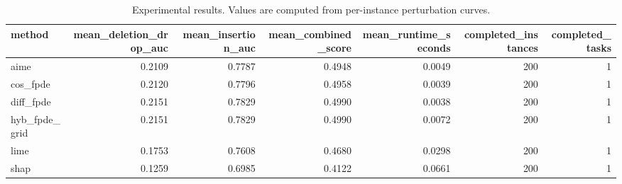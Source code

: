 \begin{table}[t]
\caption{Experimental results. Values are computed from per-instance perturbation curves.}
\label{tab:main_results_computed}
\centering
\begin{tabular}{lrrrrrr}
\toprule
method & mean\_deletion\_drop\_auc & mean\_insertion\_auc & mean\_combined\_score & mean\_runtime\_seconds & completed\_instances & completed\_tasks \\
\midrule
aime & 0.2109 & 0.7787 & 0.4948 & 0.0049 & 200 & 1 \\
cos\_fpde & 0.2120 & 0.7796 & 0.4958 & 0.0039 & 200 & 1 \\
diff\_fpde & 0.2151 & 0.7829 & 0.4990 & 0.0038 & 200 & 1 \\
hyb\_fpde\_grid & 0.2151 & 0.7829 & 0.4990 & 0.0072 & 200 & 1 \\
lime & 0.1753 & 0.7608 & 0.4680 & 0.0298 & 200 & 1 \\
shap & 0.1259 & 0.6985 & 0.4122 & 0.0661 & 200 & 1 \\
\bottomrule
\end{tabular}

\end{table}
